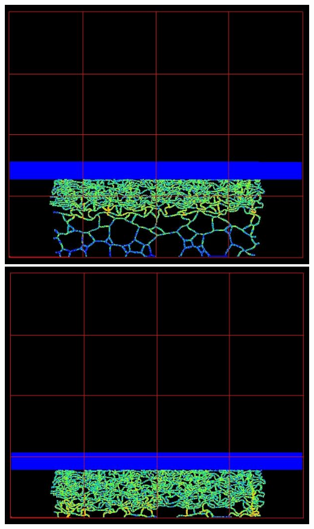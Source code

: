 \documentclass{beamer}
\begin{document}
\begin{frame}
{                      \includegraphics{FIGS/foamCrush40mm_v1_ng_200ms_09.jpg}
                      \hspace{12pt}
                      \includegraphics{FIGS/foamCrush40mm_v1_ng_200ms_11.jpg}}
    \end{frame}
\end{document}
